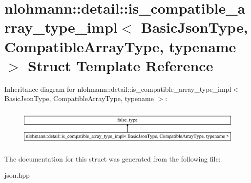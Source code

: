 \hypertarget{structnlohmann_1_1detail_1_1is__compatible__array__type__impl}{}\section{nlohmann\+:\+:detail\+:\+:is\+\_\+compatible\+\_\+array\+\_\+type\+\_\+impl$<$ Basic\+Json\+Type, Compatible\+Array\+Type, typename $>$ Struct Template Reference}
\label{structnlohmann_1_1detail_1_1is__compatible__array__type__impl}
Inheritance diagram for nlohmann\+:\+:detail\+:\+:is\+\_\+compatible\+\_\+array\+\_\+type\+\_\+impl$<$ Basic\+Json\+Type, Compatible\+Array\+Type, typename $>$\+:\begin{figure}[H]
\begin{center}
\leavevmode
\includegraphics[height=1.882353cm]{structnlohmann_1_1detail_1_1is__compatible__array__type__impl}
\end{center}
\end{figure}


The documentation for this struct was generated from the following file\+:\begin{DoxyCompactItemize}
\item 
json.\+hpp\end{DoxyCompactItemize}
